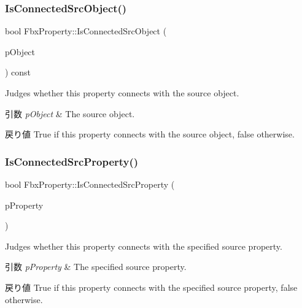 \subsubsection{\texorpdfstring{Is\+Connected\+Src\+Object()}{IsConnectedSrcObject()}}
{\footnotesize\ttfamily bool Fbx\+Property\+::\+Is\+Connected\+Src\+Object (\begin{DoxyParamCaption}\item[{const \hyperlink{class_fbx_object}{Fbx\+Object} $\ast$}]{p\+Object }\end{DoxyParamCaption}) const}

Judges whether this property connects with the source object. 
\begin{DoxyParams}{引数}
{\em p\+Object} & The source object. \\
\hline
\end{DoxyParams}
\begin{DoxyReturn}{戻り値}
{\ttfamily True} if this property connects with the source object, {\ttfamily false} otherwise. 
\end{DoxyReturn}
\mbox{\label{class_fbx_property_aca4ace4ad256046bc548c54173dab0c1}} 
\subsubsection{\texorpdfstring{Is\+Connected\+Src\+Property()}{IsConnectedSrcProperty()}}
{\footnotesize\ttfamily bool Fbx\+Property\+::\+Is\+Connected\+Src\+Property (\begin{DoxyParamCaption}\item[{const \hyperlink{class_fbx_property}{Fbx\+Property} \&}]{p\+Property }\end{DoxyParamCaption})}

Judges whether this property connects with the specified source property. 
\begin{DoxyParams}{引数}
{\em p\+Property} & The specified source property. \\
\hline
\end{DoxyParams}
\begin{DoxyReturn}{戻り値}
{\ttfamily True} if this property connects with the specified source property, {\ttfamily false} otherwise. 
\end{DoxyReturn}
\mbox{\label{class_fbx_property_aa346bfac7ee0847e7fa2a6dc4aba90ac}} 

